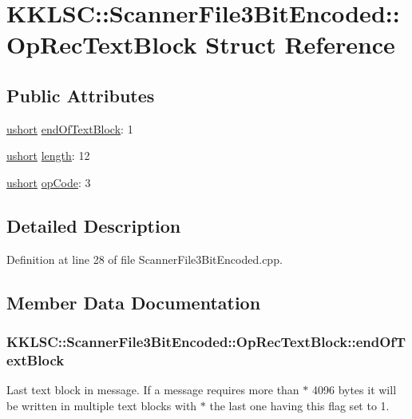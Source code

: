 \hypertarget{struct_scanner_file3_bit_encoded_1_1_op_rec_text_block}{}\section{K\+K\+L\+SC\+:\+:Scanner\+File3\+Bit\+Encoded\+:\+:Op\+Rec\+Text\+Block Struct Reference}
\label{struct_scanner_file3_bit_encoded_1_1_op_rec_text_block}
\subsection*{Public Attributes}
\begin{DoxyCompactItemize}
\item 
\hyperlink{namespace_k_k_b_a4a7e2d1bab49f38edf25c38a8dc20012}{ushort} \hyperlink{struct_scanner_file3_bit_encoded_1_1_op_rec_text_block_a2ce0726dd05819684ae6bbc24abbe66e}{end\+Of\+Text\+Block}\+: 1
\item 
\hyperlink{namespace_k_k_b_a4a7e2d1bab49f38edf25c38a8dc20012}{ushort} \hyperlink{struct_scanner_file3_bit_encoded_1_1_op_rec_text_block_a1f4e6cc7c239ec14fa70fed6c52a6918}{length}\+: 12
\item 
\hyperlink{namespace_k_k_b_a4a7e2d1bab49f38edf25c38a8dc20012}{ushort} \hyperlink{struct_scanner_file3_bit_encoded_1_1_op_rec_text_block_a62b5cddfc0ca9deedc14f5d5b4d47a54}{op\+Code}\+: 3
\end{DoxyCompactItemize}


\subsection{Detailed Description}


Definition at line 28 of file Scanner\+File3\+Bit\+Encoded.\+cpp.



\subsection{Member Data Documentation}
\subsubsection[{\texorpdfstring{end\+Of\+Text\+Block}{endOfTextBlock}}]{ K\+K\+L\+S\+C\+::\+Scanner\+File3\+Bit\+Encoded\+::\+Op\+Rec\+Text\+Block\+::end\+Of\+Text\+Block}\hypertarget{struct_scanner_file3_bit_encoded_1_1_op_rec_text_block_a2ce0726dd05819684ae6bbc24abbe66e}{}\label{struct_scanner_file3_bit_encoded_1_1_op_rec_text_block_a2ce0726dd05819684ae6bbc24abbe66e}
Last text block in message. If a message requires more than $\ast$ 4096 bytes it will be written in multiple text blocks with $\ast$ the last one having this flag set to \textquotesingle{}1\textquotesingle{}. 

